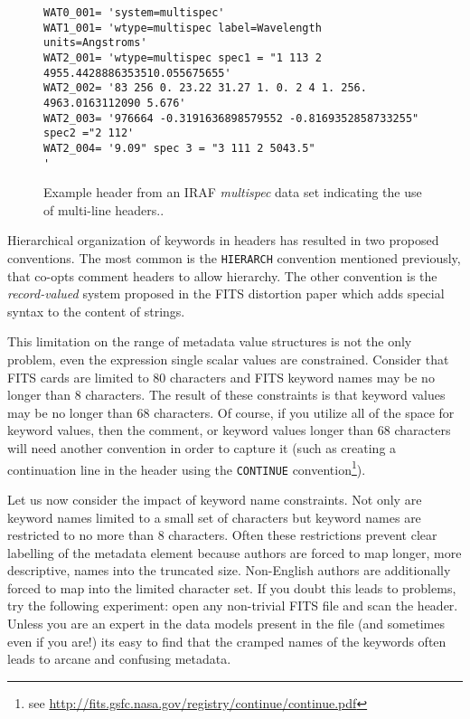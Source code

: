 \documentclass[final,authoryear,5p,times,twocolumn]{elsarticle}
\begin{document}
\begin{figure*}
\begin{minipage}{\textwidth}
\begin{center}
\begin{verbatim}
WAT0_001= 'system=multispec'
WAT1_001= 'wtype=multispec label=Wavelength units=Angstroms'
WAT2_001= 'wtype=multispec spec1 = "1 113 2 4955.4428886353510.055675655'
WAT2_002= '83 256 0. 23.22 31.27 1. 0. 2 4 1. 256. 4963.0163112090 5.676'
WAT2_003= '976664 -0.3191636898579552 -0.8169352858733255" spec2 ="2 112'
WAT2_004= '9.09" spec 3 = "3 111 2 5043.5"                              '
\end{verbatim}
\end{center}
\caption{Example header from an IRAF \textit{multispec} data set
  indicating the use of multi-line headers..}
\label{fig:multispec}
\end{minipage}
\end{figure*}

Hierarchical organization of keywords in headers has resulted in two
proposed conventions. The most common is the \texttt{HIERARCH} convention
mentioned previously, that co-opts comment headers to allow
hierarchy. The other convention is the \emph{record-valued} system
proposed in the FITS distortion paper \citep{FITSDistort} which
adds special syntax to the content of strings.

This limitation on the range of metadata value structures is not the
only problem, even the expression single scalar values are
constrained. Consider that FITS cards are limited to 80 characters and FITS
keyword names may be no longer than 8 characters. The result of these
constraints is that keyword values may be no longer than 68 characters. Of
course, if you utilize all of the space for keyword values, then the
comment, or keyword values longer than 68 characters will need another
convention in order to capture it (such as creating a continuation
line in the header using the \texttt{CONTINUE} convention\footnote{see
\url{http://fits.gsfc.nasa.gov/registry/continue/continue.pdf}}).


Let us now consider the impact of keyword name constraints. Not only
are keyword names limited to a small set of characters but keyword
names are restricted to no more than 8 characters. Often these
restrictions prevent clear labelling of the metadata element because
authors are forced to map longer, more descriptive, names into the
truncated size. Non-English authors are additionally forced to map
into the limited character set. If you doubt this leads to problems,
try the following experiment: open any non-trivial FITS file and scan
the header. Unless you are an expert in the data models present in the
file (and sometimes even if you are!) its easy to find that the
cramped names of the keywords often leads to arcane and confusing
metadata.
\end{document}
